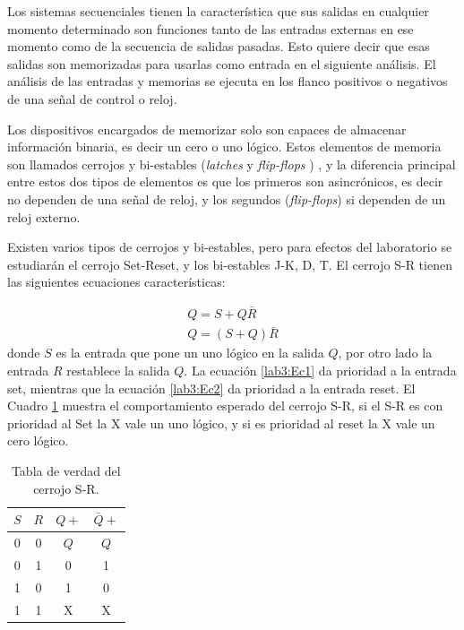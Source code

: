  Los sistemas secuenciales tienen la característica que sus salidas en cualquier momento determinado son funciones tanto de las entradas externas en ese momento como de la secuencia de salidas pasadas. Esto quiere decir que esas salidas son memorizadas para usarlas como entrada en el siguiente análisis. El análisis de las entradas y memorias se ejecuta en los flanco positivos o negativos de una señal de control o reloj.
 
 Los dispositivos encargados de memorizar solo son capaces de almacenar información binaria, es decir un cero o uno lógico. Estos elementos de memoria son llamados cerrojos y bi-estables (\textit{latches} y \textit{flip-flops} ) , y la diferencia principal entre estos dos tipos de elementos es que los primeros son asincrónicos, es decir no dependen de una señal de reloj, y los segundos (\textit{flip-flops}) si dependen de un reloj externo. 

Existen varios tipos de cerrojos y bi-estables, pero para efectos del laboratorio se estudiarán el cerrojo Set-Reset, y los bi-estables J-K, D, T. El cerrojo S-R tienen las siguientes ecuaciones características:

\begin{eqnarray}
\label{lab3:Ec1}
Q=S+Q\bar{R} \\ \label{lab3:Ec2}
Q=(S+Q)\bar{R}
\end{eqnarray}
donde $S$ es la entrada que pone un uno lógico en la salida $Q$, por otro lado la entrada $R$ restablece la salida $Q$. La ecuación \eqref{lab3:Ec1} da prioridad a la entrada set, mientras que la ecuación \eqref{lab3:Ec2} da prioridad a la entrada reset. El Cuadro \ref{tab:SR} muestra el comportamiento esperado del cerrojo S-R, si el S-R es con prioridad al Set la X vale un uno lógico, y si es prioridad al reset la X vale un cero lógico. 

\begin{table}
	\centering
	\caption{Tabla de verdad del cerrojo S-R.}
	\label{tab:SR}
	\begin{tabular}{cccc}
		\toprule
		$S$ & $R$ & $Q+$ & $\bar{Q}+$ \\
		\midrule
		0 & 0 &	$Q$	& $Q$ \\ 
		0 & 1 &	0 & 1 \\ 
		1 & 0 &	1 &	0 \\ 
		1 & 1 &	X &	X \\ 	
		\bottomrule
	\end{tabular} 
\end{table} 

